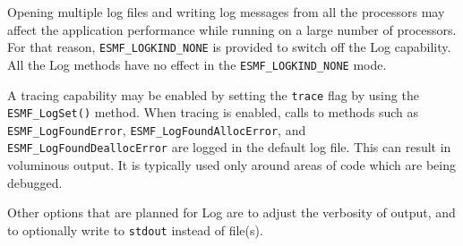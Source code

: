 Opening multiple log files and writing log messages from all the processors
may affect the application performance while running on a large number of
processors.  For that reason, {\tt ESMF\_LOGKIND\_NONE} is provided to
switch off the Log capability.  All the Log methods have no effect
in the {\tt ESMF\_LOGKIND\_NONE} mode.

\begin{sloppypar}
A tracing capability may be enabled by setting the {\tt trace} flag by
using the {\tt ESMF\_LogSet()} method.  When tracing is enabled, calls to
methods such as {\tt ESMF\_LogFoundError}, {\tt ESMF\_LogFoundAllocError},
and {\tt ESMF\_LogFoundDeallocError} are logged in the default log file.
This can result in voluminous output.  It is typically used only around areas
of code which are being debugged.
\end{sloppypar}
   
Other options that are planned for Log are to adjust the verbosity of output, and to optionally write to {\tt stdout} instead of file(s).




